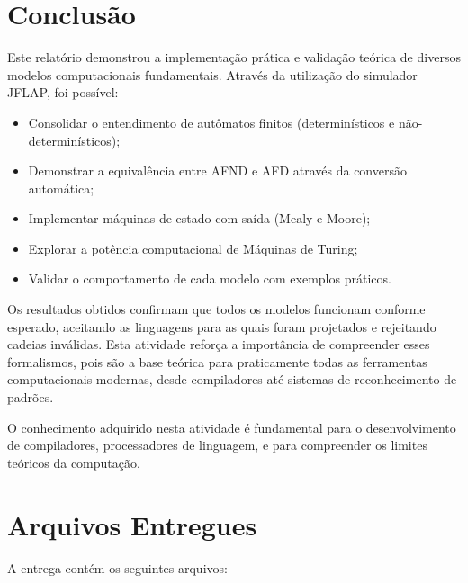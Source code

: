 \documentclass[12pt,a4paper]{article}
\begin{document}
\newpage

\section{Conclusão}

Este relatório demonstrou a implementação prática e validação teórica de diversos modelos computacionais fundamentais. Através da utilização do simulador JFLAP, foi possível:

\begin{itemize}
    \item Consolidar o entendimento de autômatos finitos (determinísticos e não-determinísticos);
    \item Demonstrar a equivalência entre AFND e AFD através da conversão automática;
    \item Implementar máquinas de estado com saída (Mealy e Moore);
    \item Explorar a potência computacional de Máquinas de Turing;
    \item Validar o comportamento de cada modelo com exemplos práticos.
\end{itemize}

Os resultados obtidos confirmam que todos os modelos funcionam conforme esperado, aceitando as linguagens para as quais foram projetados e rejeitando cadeias inválidas. Esta atividade reforça a importância de compreender esses formalismos, pois são a base teórica para praticamente todas as ferramentas computacionais modernas, desde compiladores até sistemas de reconhecimento de padrões.

O conhecimento adquirido nesta atividade é fundamental para o desenvolvimento de compiladores, processadores de linguagem, e para compreender os limites teóricos da computação.

\newpage

\appendix

\section{Arquivos Entregues}

A entrega contém os seguintes arquivos:
\end{document}

